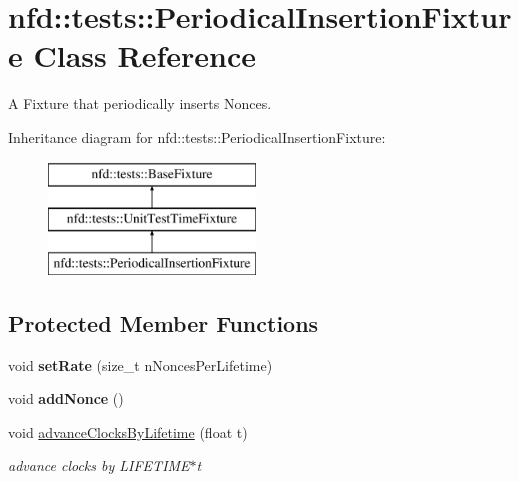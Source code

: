 \hypertarget{classnfd_1_1tests_1_1PeriodicalInsertionFixture}{}\section{nfd\+:\+:tests\+:\+:Periodical\+Insertion\+Fixture Class Reference}
\label{classnfd_1_1tests_1_1PeriodicalInsertionFixture}


A Fixture that periodically inserts Nonces.  


Inheritance diagram for nfd\+:\+:tests\+:\+:Periodical\+Insertion\+Fixture\+:\begin{figure}[H]
\begin{center}
\leavevmode
\includegraphics[height=3.000000cm]{classnfd_1_1tests_1_1PeriodicalInsertionFixture}
\end{center}
\end{figure}
\subsection*{Protected Member Functions}
\begin{DoxyCompactItemize}
\item 
void {\bfseries set\+Rate} (size\+\_\+t n\+Nonces\+Per\+Lifetime)\hypertarget{classnfd_1_1tests_1_1PeriodicalInsertionFixture_af30831f17a5d7f6280912949a1bd4552}{}\label{classnfd_1_1tests_1_1PeriodicalInsertionFixture_af30831f17a5d7f6280912949a1bd4552}

\item 
void {\bfseries add\+Nonce} ()\hypertarget{classnfd_1_1tests_1_1PeriodicalInsertionFixture_a43efa5a145b7cf7ca404c2a8febc1b79}{}\label{classnfd_1_1tests_1_1PeriodicalInsertionFixture_a43efa5a145b7cf7ca404c2a8febc1b79}

\item 
void \hyperlink{classnfd_1_1tests_1_1PeriodicalInsertionFixture_aa0ef37879c95d0dbff0b8b3995ba7671}{advance\+Clocks\+By\+Lifetime} (float t)\hypertarget{classnfd_1_1tests_1_1PeriodicalInsertionFixture_aa0ef37879c95d0dbff0b8b3995ba7671}{}\label{classnfd_1_1tests_1_1PeriodicalInsertionFixture_aa0ef37879c95d0dbff0b8b3995ba7671}

\begin{DoxyCompactList}\small\item\em advance clocks by L\+I\+F\+E\+T\+I\+M\+E$\ast$t \end{DoxyCompactList}\end{DoxyCompactItemize}
